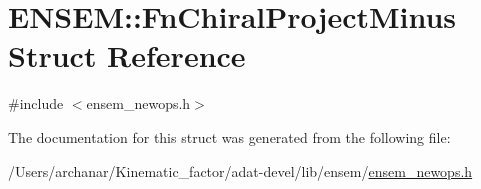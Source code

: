 \hypertarget{structENSEM_1_1FnChiralProjectMinus}{}\section{E\+N\+S\+EM\+:\+:Fn\+Chiral\+Project\+Minus Struct Reference}
\label{structENSEM_1_1FnChiralProjectMinus}


{\ttfamily \#include $<$ensem\+\_\+newops.\+h$>$}



The documentation for this struct was generated from the following file\+:\begin{DoxyCompactItemize}
\item 
/\+Users/archanar/\+Kinematic\+\_\+factor/adat-\/devel/lib/ensem/\mbox{\hyperlink{adat-devel_2lib_2ensem_2ensem__newops_8h}{ensem\+\_\+newops.\+h}}\end{DoxyCompactItemize}
